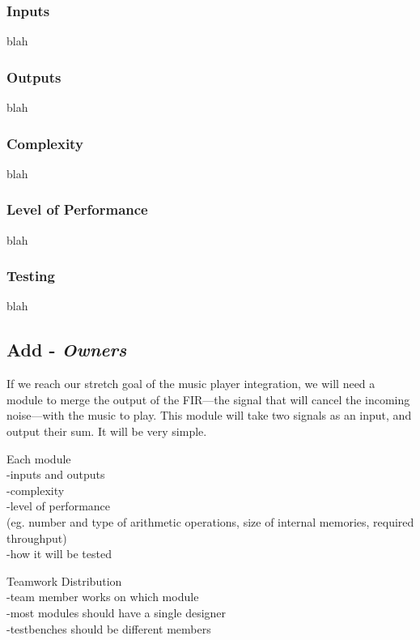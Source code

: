\documentclass[12pt]{article}
\begin{document}
\begin{multicols}{2}
\subsubsection{Inputs}
blah
\subsubsection{Outputs}
blah
\subsubsection{Complexity}
blah
\subsubsection{Level of Performance}
blah
\subsubsection{Testing}
blah

\subsection{Add - \textit{Owners}}
If we reach our stretch goal of the music player integration, we will need a module to merge the output of the FIR---the signal that will cancel the incoming noise---with the music to play. This module will take two signals as an input, and output their sum. It will be very simple.

\end{multicols}
Each module
\\-inputs and outputs
\\-complexity
\\-level of performance
\\(eg. number and type of arithmetic operations, size of internal memories, required throughput)
\\-how it will be tested

Teamwork Distribution
\\-team member works on which module 
\\-most modules should have a single designer
\\-testbenches should be different members

\printbibliography
\end{document}

